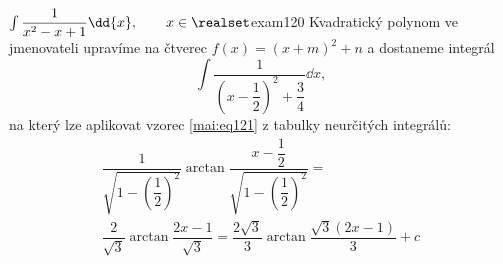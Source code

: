 \begin{mathexam}{\(\int\dfrac{1}{x^2 - x + 1}\dd{x}, \qquad x\in\realset\)}{exam120}
  Kvadratický polynom ve jmenovateli upravíme na čtverec \(f(x) = (x + m)^2 + n\) a dostaneme
  integrál
  \begin{equation*}
    \int\dfrac{1}{\left(x-\dfrac{1}{2}\right)^2+\dfrac{3}{4}}\dd{x},
  \end{equation*}
  na který lze aplikovat vzorec \ref{mai:eq121} z tabulky neurčitých integrálů: 
  \begin{multline*}
    \dfrac{1}{\sqrt{1-\left(\dfrac{1}{2}\right)^2}}\arctan
    \dfrac{x-\dfrac{1}{2}}{\sqrt{1-\left(\dfrac{1}{2}\right)^2}} = \\
    \dfrac{2}{\sqrt{3}}\arctan\dfrac{2x-1}{\sqrt{3}}  =
    \dfrac{2\sqrt{3}}{3}\arctan\dfrac{\sqrt{3}(2x-1)}{3} + c
  \end{multline*}
\end{mathexam}